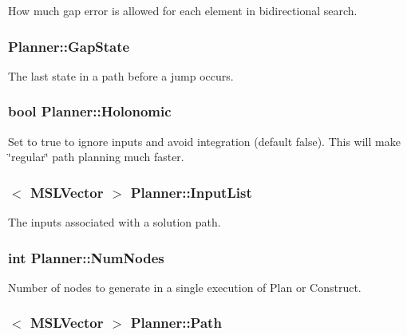 How much gap error is allowed for each element in bidirectional search.

\subsubsection{ Planner::Gap\-State}\label{classPlanner_m4}


The last state in a path before a jump occurs.

\subsubsection{\setlength{\rightskip}{0pt plus 5cm}bool Planner::Holonomic}\label{classPlanner_m5}


Set to true to ignore inputs and avoid integration (default false). This will make \char`\"{}regular\char`\"{} path planning much faster.

\subsubsection{$<$ {\bf MSLVector} $>$ Planner::Input\-List}\label{classPlanner_m12}


The inputs associated with a solution path.

\subsubsection{\setlength{\rightskip}{0pt plus 5cm}int Planner::Num\-Nodes}\label{classPlanner_m13}


Number of nodes to generate in a single execution of Plan or Construct.

\subsubsection{$<$ {\bf MSLVector} $>$ Planner::Path}\label{classPlanner_m2}


